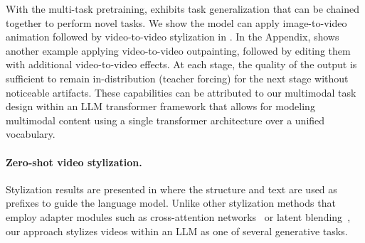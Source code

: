 %
With the multi-task pretraining, \modelname{} exhibits task generalization that can be chained together to perform novel tasks.
%
We show the model can apply image-to-video animation followed by video-to-video stylization in .
In the Appendix,  shows another example applying video-to-video outpainting, followed by editing them with additional video-to-video effects.
%
At each stage, the quality of the output is sufficient to remain in-distribution (\ie teacher forcing) for the next stage without noticeable artifacts.
%
These capabilities can be attributed to our multimodal task design within an LLM transformer framework that allows for modeling multimodal content using a single transformer architecture over a unified vocabulary. 

\vspace{-4mm}
\paragraph{Zero-shot video stylization.}
Stylization results are presented in  where the structure and text are used as prefixes to guide the language model. Unlike other stylization methods that employ adapter modules such as cross-attention networks~\cite{zhang2023adding} or latent blending~\cite{meng2021sdedit}, our approach stylizes videos within an LLM as one of several generative tasks.


\vspace{-4mm}
